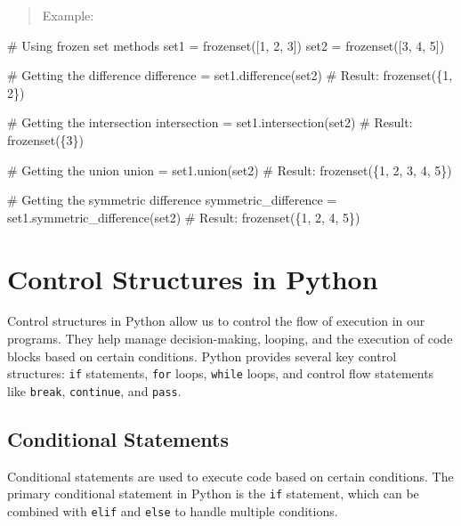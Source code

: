\documentclass[
  letterpaper,
  DIV=11,
  numbers=noendperiod]{scrreprt}
\newenvironment{Shaded}{\begin{snugshade}}{\end{snugshade}}
\newcommand{\BuiltInTok}[1]{\textcolor[rgb]{0.00,0.23,0.31}{#1}}
\newcommand{\CommentTok}[1]{\textcolor[rgb]{0.37,0.37,0.37}{#1}}
\newcommand{\DecValTok}[1]{\textcolor[rgb]{0.68,0.00,0.00}{#1}}
\newcommand{\NormalTok}[1]{\textcolor[rgb]{0.00,0.23,0.31}{#1}}
\newcommand{\OperatorTok}[1]{\textcolor[rgb]{0.37,0.37,0.37}{#1}}
\theoremstyle{plain}
\theoremstyle{definition}
\theoremstyle{remark}
\begin{document}
\begin{quote}
Example:
\end{quote}

\begin{Shaded}
\begin{Highlighting}[]
\CommentTok{\# Using frozen set methods}
\NormalTok{set1 }\OperatorTok{=} \BuiltInTok{frozenset}\NormalTok{([}\DecValTok{1}\NormalTok{, }\DecValTok{2}\NormalTok{, }\DecValTok{3}\NormalTok{])}
\NormalTok{set2 }\OperatorTok{=} \BuiltInTok{frozenset}\NormalTok{([}\DecValTok{3}\NormalTok{, }\DecValTok{4}\NormalTok{, }\DecValTok{5}\NormalTok{])}

\CommentTok{\# Getting the difference}
\NormalTok{difference }\OperatorTok{=}\NormalTok{ set1.difference(set2)  }\CommentTok{\# Result: frozenset(\{1, 2\})}

\CommentTok{\# Getting the intersection}
\NormalTok{intersection }\OperatorTok{=}\NormalTok{ set1.intersection(set2)  }\CommentTok{\# Result: frozenset(\{3\})}

\CommentTok{\# Getting the union}
\NormalTok{union }\OperatorTok{=}\NormalTok{ set1.union(set2)  }\CommentTok{\# Result: frozenset(\{1, 2, 3, 4, 5\})}

\CommentTok{\# Getting the symmetric difference}
\NormalTok{symmetric\_difference }\OperatorTok{=}\NormalTok{ set1.symmetric\_difference(set2)  }\CommentTok{\# Result: frozenset(\{1, 2, 4, 5\})}
\end{Highlighting}
\end{Shaded}

\section{Control Structures in
Python}\label{control-structures-in-python}

Control structures in Python allow us to control the flow of execution
in our programs. They help manage decision-making, looping, and the
execution of code blocks based on certain conditions. Python provides
several key control structures: \texttt{if} statements, \texttt{for}
loops, \texttt{while} loops, and control flow statements like
\texttt{break}, \texttt{continue}, and \texttt{pass}.

\subsection{Conditional Statements}\label{conditional-statements}

Conditional statements are used to execute code based on certain
conditions. The primary conditional statement in Python is the
\texttt{if} statement, which can be combined with \texttt{elif} and
\texttt{else} to handle multiple conditions.
\end{document}
